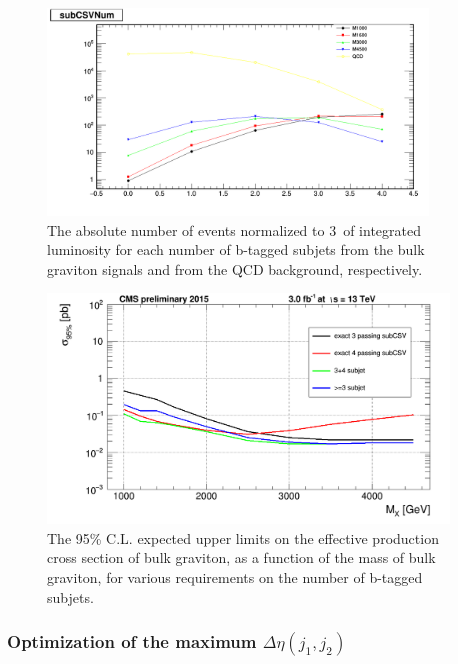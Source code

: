 \begin{figure}[htbp]
   \centering
   \includegraphics[width=0.9\textwidth]{figures/optimization/numberSubjetBtag/CSVNum2.png}
   \caption{The absolute number of events normalized 
     to 3~\fbinv of integrated luminosity for each number of b-tagged 
   subjets from the bulk graviton signals and from the QCD background, 
   respectively.}
   \label{fig:nsubb}
\end{figure}



\begin{figure}[htbp]
   \centering
   \includegraphics[width=0.95\textwidth]{figures/optimization/numberSubjetBtag/limitofNumCSV.png}
   \caption{The 95\% C.L. expected upper limits on the 
     effective production cross section of bulk graviton, as a function of the mass of 
     bulk graviton, for various requirements on the number of b-tagged 
     subjets.}
   \label{fig:nbsublimit}
\end{figure}


\subsubsection*{Optimization of the maximum $\Delta \eta (j_1,j_2)$ \label{sec:optdeta}}

